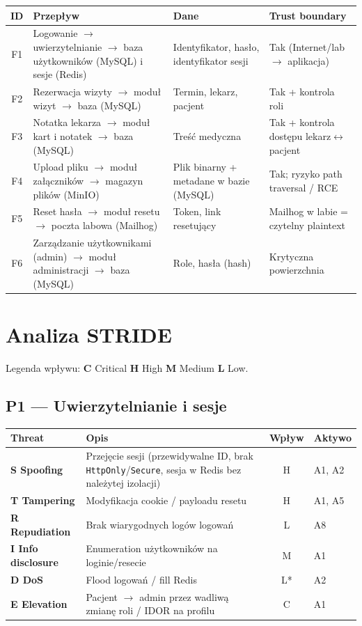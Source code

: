 \documentclass[11pt,a4paper]{article}
\begin{document}
\begin{tabularx}{\textwidth}{@{}c L L L@{}}
\toprule
\textbf{ID} & \textbf{Przepływ} & \textbf{Dane} & \textbf{Trust boundary} \\
\midrule
F1 & Logowanie $\rightarrow$ uwierzytelnianie $\rightarrow$ baza użytkowników (MySQL) i sesje (Redis) & Identyfikator, hasło, identyfikator sesji & Tak (Internet/lab $\rightarrow$ aplikacja) \\
F2 & Rezerwacja wizyty $\rightarrow$ moduł wizyt $\rightarrow$ baza (MySQL) & Termin, lekarz, pacjent & Tak + kontrola roli \\
F3 & Notatka lekarza $\rightarrow$ moduł kart i notatek $\rightarrow$ baza (MySQL) & Treść medyczna & Tak + kontrola dostępu lekarz$\leftrightarrow$pacjent \\
F4 & Upload pliku $\rightarrow$ moduł załączników $\rightarrow$ magazyn plików (MinIO) & Plik binarny + metadane w bazie (MySQL) & Tak; ryzyko path traversal / RCE \\
F5 & Reset hasła $\rightarrow$ moduł resetu $\rightarrow$ poczta labowa (Mailhog) & Token, link resetujący & Mailhog w labie = czytelny plaintext \\
F6 & Zarządzanie użytkownikami (admin) $\rightarrow$ moduł administracji $\rightarrow$ baza (MySQL) & Role, hasła (hash) & Krytyczna powierzchnia \\
\bottomrule
\end{tabularx}

\section{Analiza STRIDE}

Legenda wpływu: \textbf{C} Critical \textbullet{} \textbf{H} High \textbullet{} \textbf{M} Medium \textbullet{} \textbf{L} Low.

\subsection{P1 — Uwierzytelnianie i sesje}

\begin{tabularx}{\textwidth}{@{}>{\bfseries}p{2.6cm} L c l@{}}
\toprule
\normalfont\textbf{Threat} & \textbf{Opis} & \textbf{Wpływ} & \textbf{Aktywo} \\
\midrule
S Spoofing & Przejęcie sesji (przewidywalne ID, brak \texttt{HttpOnly}/\texttt{Secure}, sesja w Redis bez należytej izolacji) & H & A1, A2 \\
T Tampering & Modyfikacja cookie / payloadu resetu & H & A1, A5 \\
R Repudiation & Brak wiarygodnych logów logowań & L & A8 \\
I Info disclosure & Enumeration użytkowników na loginie/resecie & M & A1 \\
D DoS & Flood logowań / fill Redis & L* & A2 \\
E Elevation & Pacjent $\rightarrow$ admin przez wadliwą zmianę roli / IDOR na profilu & C & A1 \\
\bottomrule
\end{tabularx}
\end{document}
